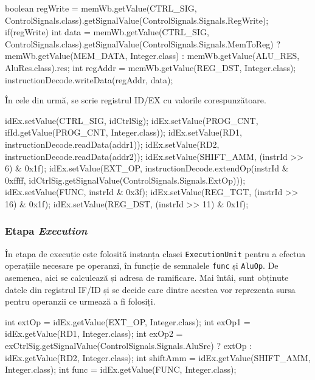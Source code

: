\documentclass{article}
\begin{document}
\begin{javacodebox}
boolean regWrite = memWb.getValue(CTRL_SIG, ControlSignals.class).getSignalValue(ControlSignals.Signals.RegWrite);
if(regWrite)
{
    int data = memWb.getValue(CTRL_SIG, ControlSignals.class).getSignalValue(ControlSignals.Signals.MemToReg)
            ? memWb.getValue(MEM_DATA, Integer.class)
            : memWb.getValue(ALU_RES, AluRes.class).res;
    int regAddr = memWb.getValue(REG_DST, Integer.class);
    instructionDecode.writeData(regAddr, data);
}
\end{javacodebox}

În cele din urmă, se scrie registrul ID/EX cu valorile corespunzătoare.

\begin{javacodebox}
idEx.setValue(CTRL_SIG, idCtrlSig);
idEx.setValue(PROG_CNT, ifId.getValue(PROG_CNT, Integer.class));
idEx.setValue(RD1, instructionDecode.readData(addr1));
idEx.setValue(RD2, instructionDecode.readData(addr2));
idEx.setValue(SHIFT_AMM, (instrId >> 6) & 0x1f);
idEx.setValue(EXT_OP, instructionDecode.extendOp(instrId & 0xffff, idCtrlSig.getSignalValue(ControlSignals.Signals.ExtOp)));
idEx.setValue(FUNC, instrId & 0x3f);
idEx.setValue(REG_TGT, (instrId >> 16) & 0x1f);
idEx.setValue(REG_DST, (instrId >> 11) & 0x1f);
\end{javacodebox}

\subsubsection{Etapa \textit{Execution}}
În etapa de execuție este folosită instanța clasei \texttt{ExecutionUnit} pentru a efectua operațiile necesare pe operanzi, în funcție de semnalele \texttt{func} și \texttt{AluOp}. De asemenea, aici se calculează și adresa de ramificare.
Mai întâi, sunt obținute datele din registrul IF/ID și se decide care dintre acestea vor reprezenta sursa pentru operanzii ce urmează a fi folosiți. 

\begin{javacodebox}
int extOp = idEx.getValue(EXT_OP, Integer.class);
int exOp1 = idEx.getValue(RD1, Integer.class);
int exOp2 = exCtrlSig.getSignalValue(ControlSignals.Signals.AluSrc)
    ? extOp
    : idEx.getValue(RD2, Integer.class);
int shiftAmm = idEx.getValue(SHIFT_AMM, Integer.class);
int func = idEx.getValue(FUNC, Integer.class);
\end{javacodebox}
\end{document}
